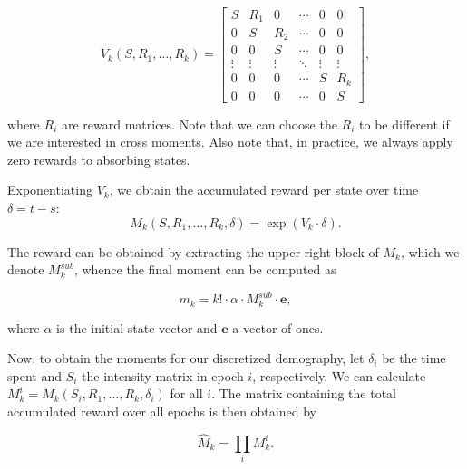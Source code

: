 \documentclass[hidelinks,11pt]{article}
\begin{document}
    \begin{equation*}
        V_{k}(S, R_1, \dots, R_k) =
        \begin{bmatrix}
            S      & R_1    & 0      & \cdots & 0      & 0      \\
            0      & S      & R_2    & \cdots & 0      & 0      \\
            0      & 0      & S      & \cdots & 0      & 0      \\
            \vdots & \vdots & \vdots & \ddots & \vdots & \vdots \\
            0      & 0      & 0      & \cdots & S      & R_k    \\
            0      & 0      & 0      & \cdots & 0      & S
        \end{bmatrix},
    \end{equation*}

    where $R_i$ are reward matrices.
    Note that we can choose the $R_i$ to be different if we are interested in cross moments.
    Also note that, in practice, we always apply zero rewards to absorbing states.

    Exponentiating $V_k$, we obtain the accumulated reward per state over time $\delta = t - s$:
    \begin{equation*}
        M_k(S, R_1, \dots, R_k,\delta) = \exp(V_k \cdot \delta).
    \end{equation*}

    The reward can be obtained by extracting the upper right block of $M_k$, which we denote $M_k^{sub}$, whence the final moment can be computed as

    \begin{equation*}
        m_k = k! \cdot \alpha \cdot M_k^{sub} \cdot \mathbf{e},
    \end{equation*}

    where $\alpha$ is the initial state vector and $\mathbf{e}$ a vector of ones.

    Now, to obtain the moments for our discretized demography, let $\delta_i$ be the time spent and $S_i$ the intensity matrix in epoch $i$, respectively.
    We can calculate $M_k^i = M_k(S_i, R_1, \dots, R_k,\delta_i)$ for all $i$.
    The matrix containing the total accumulated reward over all epochs is then obtained by

    \begin{equation}
        \label{eq:prod_moments}
        \hat{M}_k = \prod_i{M_k^i}.
    \end{equation}
\end{document}
